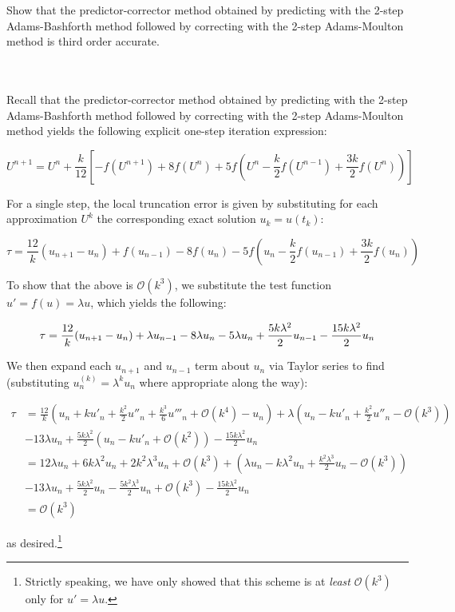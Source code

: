 Show that the predictor-corrector method obtained by predicting with the 2-step Adams-Bashforth method followed by
correcting with the 2-step Adams-Moulton method is third order accurate.

\begin{solution}\ \\\\
    Recall that the predictor-corrector method obtained by predicting with the 2-step Adams-Bashforth method followed by
    correcting with the 2-step Adams-Moulton method yields the following explicit one-step iteration expression:

    $$
    U^{n+1} = U^n + \frac{k}{12}\left[ -f(U^{n+1}) + 8 f(U^n) + 5f\left(U^n - \frac{k}{2} f(U^{n-1}) + \frac{3 k}{2} f(U^n)\right) \right]
    $$

    For a single step, the local truncation error is given by substituting for each approximation $U^k$ the 
    corresponding exact solution $u_k = u(t_k)$:

    $$
    \tau = \frac{12}{k} (u_{n+1} - u_n) + f(u_{n-1}) - 8 f(u_n) - 5f\left(u_n - \frac{k}{2} f(u_{n-1}) + \frac{3 k}{2} f(u_n)\right)
    $$

    To show that the above is $\mathcal{O}(k^3)$, we substitute the test function $u' = f(u) = \lambda u$, which yields
    the following:

    $$
    \tau = \frac{12}{k} (u_{n+1} - u_n) + \lambda u_{n-1} - 8 \lambda u_n - 5 \lambda u_n + \frac{5 k \lambda^2}{2} u_{n-1} - \frac{15 k \lambda^2}{2} u_n \\
    $$

    We then expand each $u_{n+1}$ and $u_{n-1}$ term about $u_n$ via Taylor series to find (substituting 
    $u^{(k)}_n = \lambda^k u_n$ where appropriate along the way):

    \begin{align*}
    \tau &= \frac{12}{k} \left(u_n + k u'_n + \frac{k^2}{2}u''_n + \frac{k^3}{6}u'''_n + \mathcal{O}(k^4) - u_n\right) + \lambda \left( u_n - k u'_n + \frac{k^2}{2}u''_n - \mathcal{O}(k^3) \right) \\
         &- 13 \lambda u_n + \frac{5 k \lambda^2}{2} \left( u_n - k u'_n + \mathcal{O}(k^2) \right) - \frac{15 k \lambda^2}{2} u_n \\
         &= 12 \lambda u_n + 6 k \lambda^2 u_n + 2 k^2 \lambda^3 u_n + \mathcal{O}(k^3) + \left( \lambda u_n - k \lambda^2 u_n + \frac{k^2 \lambda^3}{2}u_n - \mathcal{O}(k^3) \right)  \\
         &- 13 \lambda u_n + \frac{5 k \lambda^2}{2} u_n - \frac{5 k^2 \lambda^3}{2} u_n + \mathcal{O}(k^3) - \frac{15 k \lambda^2}{2} u_n \\
         &= \mathcal{O}(k^3)
    \end{align*}

    as desired.\footnote{
        Strictly speaking, we have only showed that this scheme is at \textit{least} $\mathcal{O}(k^3)$ only for 
        $u' = \lambda u$.
    }
    \ \\
\end{solution}